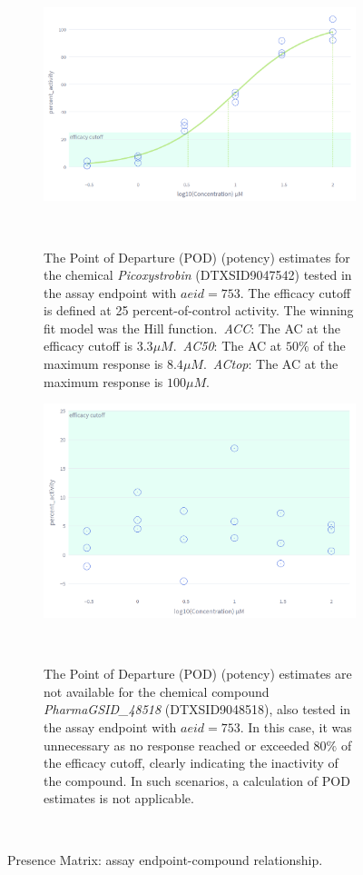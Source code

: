 \begin{figure}
    \centering
    \begin{subfigure}[b]{0.48\textwidth}
        \centering
        \includegraphics[width=\textwidth]{figures/POD.png}
        \caption{The Point of Departure (POD) (potency) estimates for the chemical \emph{Picoxystrobin} (DTXSID9047542) tested in the assay endpoint with $aeid=753$. The efficacy cutoff is defined at 25 percent-of-control activity. The winning fit model was the Hill function.~\emph{ACC}: The AC at the efficacy cutoff is $3.3 \mu M$.~\emph{AC50}: The AC at $50\%$ of the maximum response is $8.4 \mu M$.~\emph{ACtop}: The AC at the maximum response is $100 \mu M$.}
    ~\label{fig:active_and_pod}
    \end{subfigure}
    \hfill
    \begin{subfigure}[b]{0.48\textwidth}
        \centering
        \includegraphics[width=\textwidth]{figures/inactive_and_no_pod.png}
        \caption{The Point of Departure (POD) (potency) estimates are not available for the chemical compound \emph{PharmaGSID\_48518} (DTXSID9048518), also tested in the assay endpoint with $aeid=753$. In this case, it was unnecessary as no response reached or exceeded $80\%$ of the efficacy cutoff, clearly indicating the inactivity of the compound. In such scenarios, a calculation of POD estimates is not applicable.}
        ~\label{fig:inactive_and_no_pod}
    \end{subfigure}
    \caption{Presence Matrix: assay endpoint-compound relationship.}
    ~\label{fig:pod}
\end{figure}


